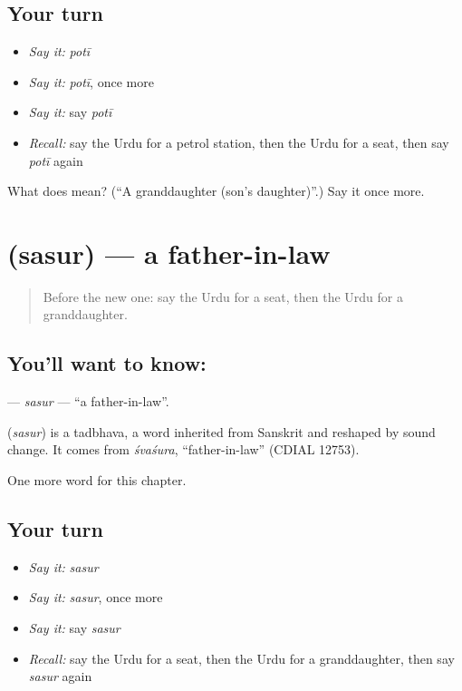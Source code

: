 \subsection*{Your turn}
\begin{itemize}
\raggedright
  \item \emph{Say it:} \emph{potī}
  \item \emph{Say it:} \emph{potī}, once more
  \item \emph{Say it:} say \emph{potī}
  \item \emph{Recall:} say the Urdu for a petrol station, then the Urdu for a seat, then say \emph{potī} again
\end{itemize}

\begin{tcolorbox}[breakable,colback=teal!4,colframe=teal!35!black,title={Before you move on}]
What does  mean? (\textquotedblleft{}A granddaughter (son's daughter)\textquotedblright{}.) Say it once more.
\end{tcolorbox}
\section[\texorpdfstring{\ur{سسر} (sasur)}{سسر (sasur)}]{ (sasur) — a father-in-law}

\label{lesson:UR-C230-sasur}



\begin{quote}
Before the new one: say the Urdu for a seat, then the Urdu for a granddaughter.
\end{quote}

\subsection*{You'll want to know: }
\textbf{} — \emph{sasur} — \textquotedblleft{}a father-in-law\textquotedblright{}.

\begin{cousinweb}
\textbf{} (\emph{sasur}) is a tadbhava, a word inherited from Sanskrit and reshaped by sound change. It comes from \emph{śvaśura}, \textquotedblleft{}father-in-law\textquotedblright{} (CDIAL 12753).
\end{cousinweb}

\begin{grammarlens}[title={What you've built}]
One more word for this chapter.
\end{grammarlens}

\subsection*{Your turn}
\begin{itemize}
\raggedright
  \item \emph{Say it:} \emph{sasur}
  \item \emph{Say it:} \emph{sasur}, once more
  \item \emph{Say it:} say \emph{sasur}
  \item \emph{Recall:} say the Urdu for a seat, then the Urdu for a granddaughter, then say \emph{sasur} again
\end{itemize}

